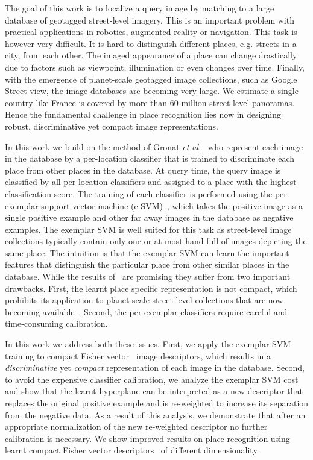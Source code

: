 \documentclass[10pt,twocolumn,letterpaper]{article}
\begin{document}
The goal of this work is to localize a query image by matching to a large database of geotagged street-level imagery.
This is an important problem with practical applications in robotics, augmented reality or navigation. This task is however very difficult. It is hard to distinguish different places, e.g. streets in a city, from each other. The imaged appearance of a place can change drastically due to factors such as  viewpoint, illumination or even changes over time.
%
Finally, with the emergence of planet-scale geotagged image collections, such as Google Street-view, the image databases are becoming very large.   
We estimate a single country like France is covered by more than 60 million street-level panoramas. Hence the fundamental challenge in place recognition lies now in designing robust, discriminative yet compact image representations.

In this work we build on the method of Gronat {\it et al.}~\cite{Gronat13} who represent each image in the database by a per-location classifier
that is trained to discriminate each place from other places in the database. At query time, the query image is classified by all per-location classifiers and assigned to a place with the highest classification score. The training of each classifier is performed using the per-exemplar support vector machine (e-SVM)~\cite{Malisiewicz11}, which takes the positive image as a single positive example and other far away images in the database as negative examples. 
The exemplar SVM is well suited for this task as street-level image collections typically contain only one or at most hand-full of images depicting the same place. The intuition is that the exemplar SVM can learn the important features that distinguish the particular place from other similar places  in the database.  While the results of~\cite{Gronat13} are promising they suffer from two important drawbacks. First, the learnt place specific representation is not compact, which prohibits its application to planet-scale street-level collections that are now becoming available~\cite{Klinger13}. Second, the per-exemplar classifiers require careful and time-consuming calibration.


In this work we address both these issues. 
First, we apply the exemplar SVM training to compact Fisher vector~\cite{Jegou2011,Perronnin2010} image descriptors, which results in a {\em discriminative} yet {\em compact} representation of each image in the database. Second, to avoid the expensive classifier calibration, we analyze the exemplar SVM cost and show that the learnt hyperplane can be interpreted as a new descriptor that replaces the original positive example and is re-weighted to increase its separation from the negative data. As a result of this analysis, we demonstrate that after an appropriate normalization of the new re-weighted descriptor no further calibration is necessary. We show improved results on place recognition using learnt compact Fisher vector descriptors~\cite{Jegou2011} of different dimensionality.
\end{document}
